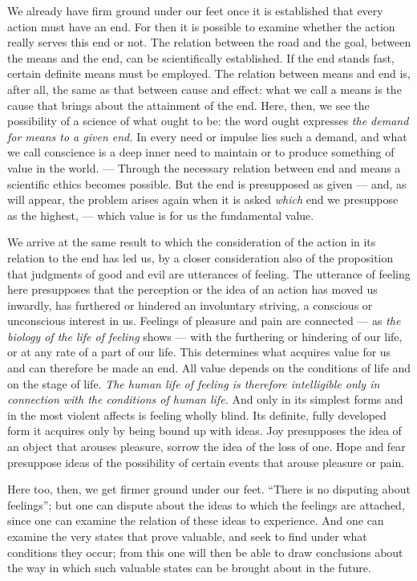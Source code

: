 \documentclass[12pt,a4paper,openany]{book}
\newcommand{\opage}[1]{\marginnote{\footnotesize\textit{[#1]}}}
\begin{document}
We already have firm ground under our feet once it is established that every action must have an
end. For then it is possible to examine whether the action really serves this end or not. The
relation between the road and the goal, between the means and the end, can be scientifically
established. If the end stands fast, certain definite means must be employed. The relation
\opage{24}between means and end is, after all, the same as that between cause and effect: what we call a
means is the cause that brings about the attainment of the end. Here, then, we see the possibility
of a science of what ought to be: the word ought expresses \textit{the demand for means to a given
end.} In every need or impulse lies such a demand, and what we call conscience is a deep inner need
to maintain or to produce something of value in the world. --- Through the necessary relation
between end and means a scientific ethics becomes possible. But the end is presupposed as given ---
and, as will appear, the problem arises again when it is asked \textit{which} end we presuppose as
the highest, --- which value is for us the fundamental value.

We arrive at the same result to which the consideration of the action in its relation to the end
has led us, by a closer consideration also of the proposition that judgments of good and evil are
utterances of feeling. The utterance of feeling here presupposes that the perception or the idea of
an action has moved us inwardly, has furthered or hindered an involuntary striving, a conscious or
unconscious interest in us. Feelings of pleasure and pain are connected --- as \textit{the biology of
the life of feeling} shows --- with the furthering or hindering of our life, or at any rate of a
part of our life. This determines what acquires value for us and can therefore be made an end. All
value depends on the conditions of life and on the stage of life. \textit{The human life of feeling
is therefore intelligible only in connection with the conditions of human life.} And only in its
simplest forms and in the most violent affects is feeling wholly blind. Its definite, fully developed
form it acquires only by being bound up with ideas. Joy presupposes the idea of an object that
arouses pleasure, sorrow the idea of the loss of one. Hope and fear presuppose ideas of the
possibility of certain events that arouse pleasure or pain.

Here too, then, we get firmer ground under our feet. ``There is no disputing about feelings''; but
one can dispute about the ideas to which the feelings are attached, since one can examine the
relation of these ideas to
\opage{25}experience. And one can examine the very states that prove valuable, and seek to find under what
conditions they occur; from this one will then be able to draw conclusions about the way in which
such valuable states can be brought about in the future.
\end{document}
